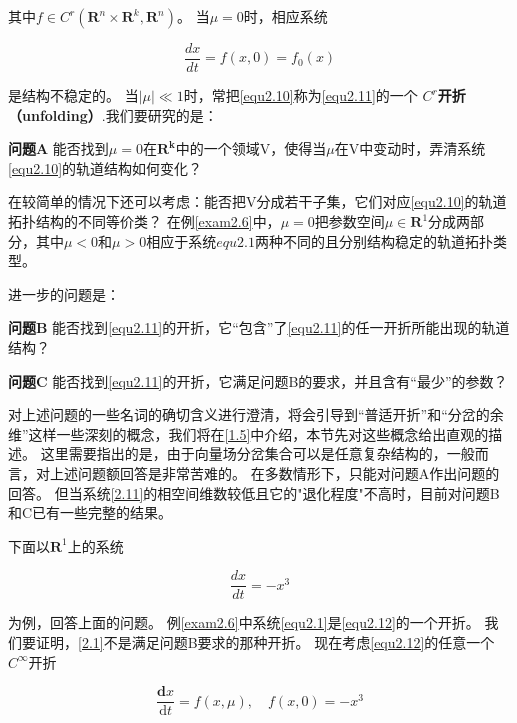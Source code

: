   其中$f \in C ^ { r } \left( \mathbf { R } ^ { n } \times \mathbf { R } ^ { k } , \mathbf { R } ^ { n } \right)$。
  当\(\mu=0\)时，相应系统
  
  \begin{equation}
    \frac { d x } { d t } = f ( x , 0 ) = f _ { 0 } ( x )
    \label{equ2.11}
  \end{equation}
  
  是结构不稳定的。
  当$| \mu | \ll 1$时，常把\ref{equ2.10}称为\ref{equ2.11}的一个  \textbf{\(C^r\)开折（unfolding）}.我们要研究的是：


  \textbf{问题A}  能否找到\(\mu=0\)在$\mathbf { R } ^ { \boldsymbol { k } }$中的一个领域V，使得当\(\mu\)在V中变动时，弄清系统\ref{equ2.10}的轨道结构如何变化？


  在较简单的情况下还可以考虑：能否把V分成若干子集，它们对应\ref{equ2.10}的轨道拓扑结构的不同等价类？
  在例\ref{exam2.6}中，\(\mu=0\)把参数空间$\mu \in \mathbf { R } ^ { 1 }$分成两部分，其中\(\mu <0\)和\(\mu > 0\)相应于系统\(equ2.1\)两种不同的且分别结构稳定的轨道拓扑类型。


  进一步的问题是：

  \textbf{问题B}  能否找到\ref{equ2.11}的开折，它“包含”了\ref{equ2.11}的任一开折所能出现的轨道结构？

  
  \textbf{问题C}  能否找到\ref{equ2.11}的开折，它满足问题B的要求，并且含有“最少”的参数？


  对上述问题的一些名词的确切含义进行澄清，将会引导到“普适开折”和“分岔的余维”这样一些深刻的概念，我们将在\ref{1.5}中介绍，本节先对这些概念给出直观的描述。
  这里需要指出的是，由于向量场分岔集合可以是任意复杂结构的，一般而言，对上述问题额回答是非常苦难的。
  在多数情形下，只能对问题A作出问题的回答。
  但当系统\ref{2.11}的相空间维数较低且它的"退化程度"不高时，目前对问题B和C已有一些完整的结果。


  下面以\(\mathbf{R}^1\)上的系统
  
  \begin{equation}
\frac { d x } { d t } = - x ^ { 3 }
\end{equation}

  为例，回答上面的问题。
  例\ref{exam2.6}中系统\ref{equ2.1}是\ref{equ2.12}的一个开折。
  我们要证明，\ref{2.1}不是满足问题B要求的那种开折。
  现在考虑\ref{equ2.12}的任意一个\(C^\infty\)开折
  
  \begin{equation}
    \frac { \mathbf { d } x } { \mathrm { d } t } = f ( x , \mu ) , \quad f ( x , 0 ) = - x ^ { 3 }
    \label{equ2.13}
  \end{equation}
  
